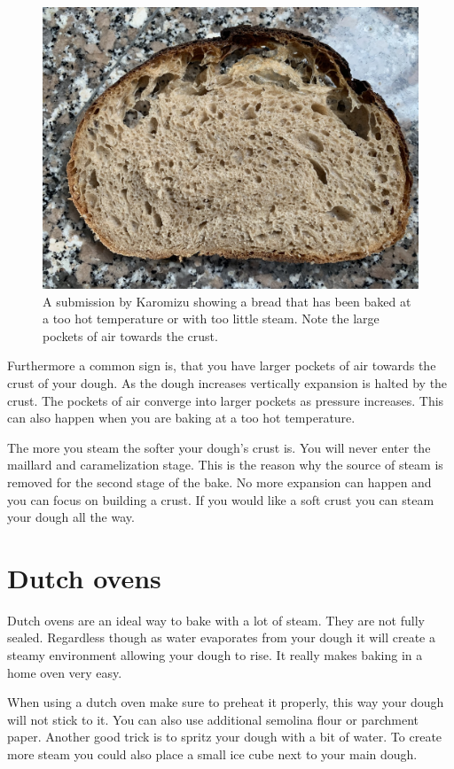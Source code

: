 \begin{figure}[!htb]
  \includegraphics[width=\textwidth]{baking-too-hot.jpeg}
  \caption{A submission by Karomizu showing a bread that has been baked
  at a too hot temperature or with too little steam. Note the large
  pockets of air towards the crust.}
\end{figure}

Furthermore a common sign is, that you have larger pockets
of air towards the crust of your dough. As the dough increases
vertically expansion is halted by the crust. The pockets
of air converge into larger pockets as pressure increases.
This can also happen when you are baking at a too hot temperature.

The more you steam the softer your dough's crust is. You will never
enter the maillard and caramelization stage. This
is the reason why the source of steam is removed
for the second stage of the bake. No more expansion can
happen and you can focus on building a crust. If you
would like a soft crust you can steam your dough all the
way.

\section{Dutch ovens}

Dutch ovens are an ideal way to bake with a lot of
steam. They are not fully sealed. Regardless though
as water evaporates from your dough it will create a steamy
environment allowing your dough to rise. It really
makes baking in a home oven very easy.

When using a dutch oven make sure to preheat it properly,
this way your dough will not stick to it. You can also
use additional semolina flour or parchment paper. Another
good trick is to spritz your dough with a bit of water.
To create more steam you could also place a small ice cube
next to your main dough.

